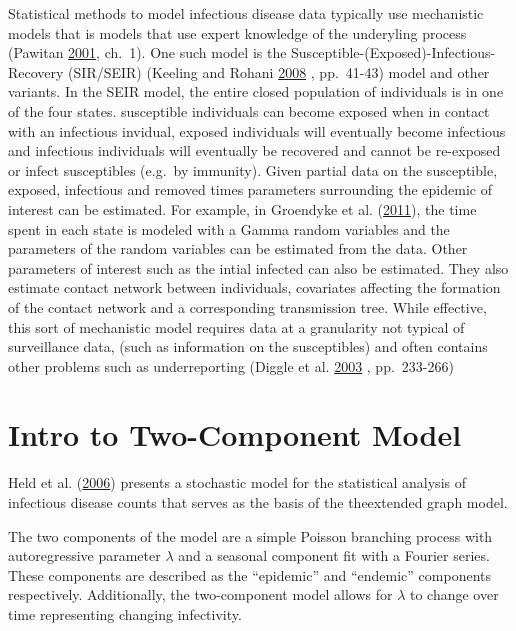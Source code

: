\documentclass[11pt,a4paper]{article}
\numberwithin{equation}{section}
\begin{document}
Statistical methods to model infectious disease data typically use
mechanistic models that is models that use expert knowledge of the
underyling process (Pawitan
\protect\hyperlink{ref-pawitan_all_2001}{2001}, ch.~1). One such model
is the Susceptible-(Exposed)-Infectious-Recovery (SIR/SEIR) (Keeling and
Rohani \protect\hyperlink{ref-keeling_modeling_2008}{2008} , pp.~41-43)
model and other variants. In the SEIR model, the entire closed
population of individuals is in one of the four states. susceptible
individuals can become exposed when in contact with an infectious
invidual, exposed individuals will eventually become infectious and
infectious individuals will eventually be recovered and cannot be
re-exposed or infect susceptibles (e.g.~by immunity). Given partial data
on the susceptible, exposed, infectious and removed times parameters
surrounding the epidemic of interest can be estimated. For example, in
Groendyke et al.
(\protect\hyperlink{ref-groendyke_bayesian_2011}{2011}), the time spent
in each state is modeled with a Gamma random variables and the
parameters of the random variables can be estimated from the data. Other
parameters of interest such as the intial infected can also be
estimated. They also estimate contact network between individuals,
covariates affecting the formation of the contact network and a
corresponding transmission tree. While effective, this sort of
mechanistic model requires data at a granularity not typical of
surveillance data, (such as information on the susceptibles) and often
contains other problems such as underreporting (Diggle et al.
\protect\hyperlink{ref-diggle_-line_2003}{2003} , pp.~233-266)

\hypertarget{intro-to-two-component-model}{%
\section{Intro to Two-Component
Model}\label{intro-to-two-component-model}}

Held et al. (\protect\hyperlink{ref-held_two-component_2006}{2006})
presents a stochastic model for the statistical analysis of infectious
disease counts that serves as the basis of the theextended graph model.

The two components of the model are a simple Poisson branching process
with autoregressive parameter \(\lambda\) and a seasonal component fit
with a Fourier series. These components are described as the
``epidemic'' and ``endemic'' components respectively. Additionally, the
two-component model allows for \(\lambda\) to change over time
representing changing infectivity.
\end{document}

